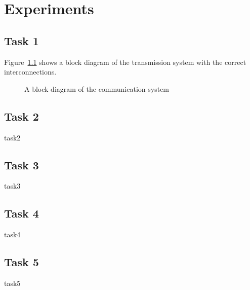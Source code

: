 \documentclass[11pt,titlepage]{report}
\begin{document}
\chapter{Experiments}
\section{Task 1}
Figure~\ref{fig:block-diagram} shows a block diagram of the transmission system with the correct interconnections.

\begin{figure}[H]
	\centering
	
	\caption{A block diagram of the communication system}
	\label{fig:block-diagram}
\end{figure}

\section{Task 2}
{task2}

\section{Task 3}
{task3}

\section{Task 4}
{task4}

\section{Task 5}
{task5}
\end{document}
